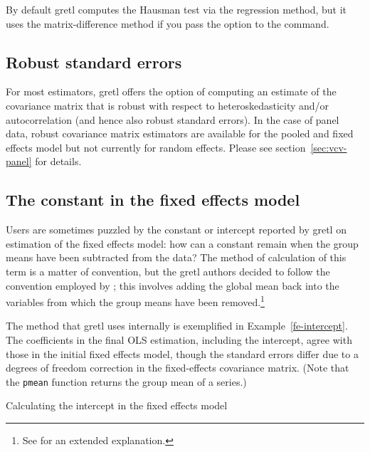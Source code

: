 By default gretl computes the Hausman test via the regression
method, but it uses the matrix-difference method if you pass the
option  to the  command.

\subsection{Robust standard errors}
\label{panel-robust}

For most estimators, gretl offers the option of computing an
estimate of the covariance matrix that is robust with respect to
heteroskedasticity and/or autocorrelation (and hence also robust
standard errors).  In the case of panel data, robust covariance matrix
estimators are available for the pooled and fixed effects model but
not currently for random effects.  Please see
section~\ref{sec:vcv-panel} for details.

\subsection{The constant in the fixed effects model}

Users are sometimes puzzled by the constant or intercept reported by
gretl on estimation of the fixed effects model: how can a constant
remain when the group means have been subtracted from the data? The
method of calculation of this term is a matter of convention, but the
gretl authors decided to follow the convention employed by
; this involves adding the global mean back into the
variables from which the group means have been removed.\footnote{See
  \cite{gould13} for an extended explanation.}

The method that gretl uses internally is exemplified in
Example~\ref{fe-intercept}. The coefficients in the final OLS
estimation, including the intercept, agree with those in the initial
fixed effects model, though the standard errors differ due to a
degrees of freedom correction in the fixed-effects covariance matrix.
(Note that the \texttt{pmean} function returns the group mean of a
series.)

\begin{script}[htbp]
  \caption{Calculating the intercept in the fixed effects model}
  \label{fe-intercept}
\end{script}

